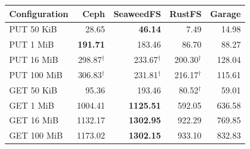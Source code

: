 \begin{tabular}{lrrrr}
\toprule
Configuration & Ceph & SeaweedFS & RustFS & Garage \\
\midrule
PUT 50 KiB & 28.65 & \textbf{46.14} & 7.49 & 14.98 \\
PUT 1 MiB & \textbf{191.71} & 183.46 & 86.70 & 88.27 \\
PUT 16 MiB & 298.87$^{\dagger}$ & 233.67$^{\dagger}$ & 200.30$^{\dagger}$ & 128.04 \\
PUT 100 MiB & 306.83$^{\dagger}$ & 231.81$^{\dagger}$ & 216.17$^{\dagger}$ & 115.61 \\
\midrule
GET 50 KiB & 95.36 & 193.46 & 80.52$^{\dagger}$ & 59.01 \\
GET 1 MiB & 1004.41 & \textbf{1125.51} & 592.05 & 636.58 \\
GET 16 MiB & 1132.17 & \textbf{1302.95} & 922.29 & 769.85 \\
GET 100 MiB & 1173.02 & \textbf{1302.15} & 933.10 & 832.83 \\
\bottomrule
\end{tabular}
